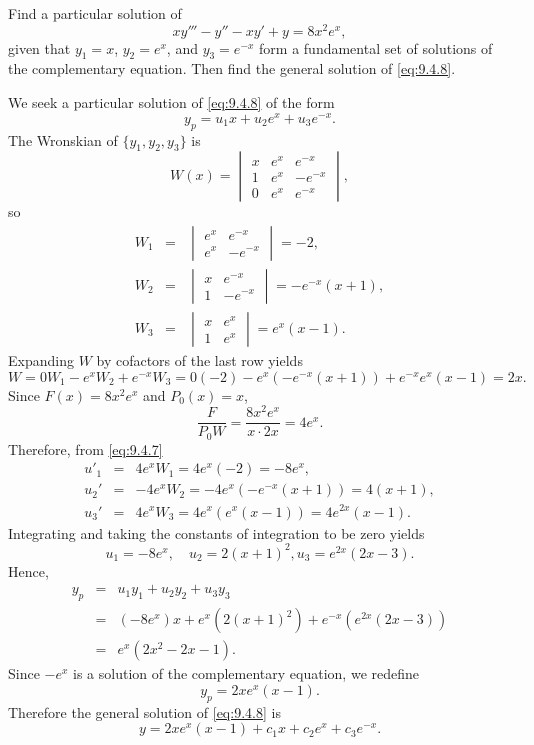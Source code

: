 \documentclass{ximera}
\begin{document}
\begin{example}\label{example:9.4.1}
 Find a particular solution of
\begin{equation} \label{eq:9.4.8}
xy'''-y''-xy'+y=8x^2e^x,
\end{equation}
given that  $y_1=x$, $y_2=e^x$, and $y_3=e^{-x}$ form a fundamental
set of solutions of the complementary equation. Then find the general
solution of \eqref{eq:9.4.8}.
 
\begin{explanation}
We seek a particular solution of \eqref{eq:9.4.8} of the form
$$
y_p=u_1x+u_2e^x+u_3e^{-x}.
$$
The Wronskian of  $\{y_1,y_2,y_3\}$ is
$$
W(x)=\begin{vmatrix}
 x&e^x&e^{-x} \\ 1&e^x&-e^{-x} \\ 0&e^x&e^{-x}
\end{vmatrix},
$$
so
\begin{eqnarray*}
W_1&=&
\begin{vmatrix}
e^x&e^{-x}\\ e^x&-e^{-x}
\end{vmatrix}=-2,\\
W_2&=&
\begin{vmatrix}
x&e^{-x}\\1&-e^{-x}
\end{vmatrix}=-e^{-x}(x+1),\\
W_3&=&
\begin{vmatrix}
x&e^x\\1&e^x
\end{vmatrix}=e^x(x-1).
\end{eqnarray*}
Expanding $W$ by cofactors of the last row yields
$$
W=0W_1-e^x W_2+e^{-x}W_3=0(-2)-e^x\left(-e^{-x}(x+1)\right)
+e^{-x}e^x(x-1)=2x.
$$
 Since $F(x)=8x^2e^x$ and $P_0(x)=x$,
$$
\frac{F}{P_0W}=\frac{8x^2e^x}{x\cdot 2x}=4e^x.
$$
Therefore, from \eqref{eq:9.4.7}
\begin{eqnarray*}
u'_1&=& 4e^xW_1=4e^x(-2)=-8e^x,\\
u_2'&=&-4e^xW_2=-4e^x\left(-e^{-x}(x+1)\right)=4(x+1),\\
u_3'&=&4e^xW_3=4e^x\left(e^x(x-1)\right)=4e^{2x}(x-1).
\end{eqnarray*}
 Integrating and taking the constants of
integration to be zero yields
$$
u_1=-8e^x,\quad u_2=2(x+1)^2, u_3=e^{2x}(2x-3).
$$
Hence,
\begin{eqnarray*}
y_p&=&u_1y_1+u_2y_2+u_3y_3\\
&=&(-8e^x)x+e^x(2(x+1)^2)+e^{-x}\left(e^{2x}(2x-3)\right)
\\&=&e^x(2x^2-2x-1).
\end{eqnarray*}
Since $-e^x$ is a solution of the complementary equation, we redefine
$$
y_p=2xe^x(x-1).
$$
 Therefore the general solution of \eqref{eq:9.4.8} is
$$
y=2xe^x(x-1)+c_1x+c_2e^x+c_3e^{-x}.
$$
\end{explanation}
\end{example}
\end{document}
